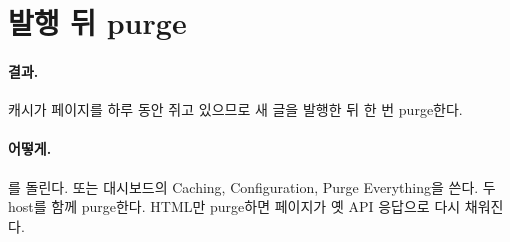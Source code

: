 \section{발행 뒤 purge}\label{sec:rt-purge}

\paragraph{결과.}
캐시가 페이지를 하루 동안 쥐고 있으므로 새 글을 발행한 뒤 한 번 purge한다.

\paragraph{어떻게.}
를 돌린다.
또는 대시보드의 Caching, Configuration, Purge Everything을 쓴다.
두 host를 함께 purge한다.
HTML만 purge하면 페이지가 옛 API 응답으로 다시 채워진다.
